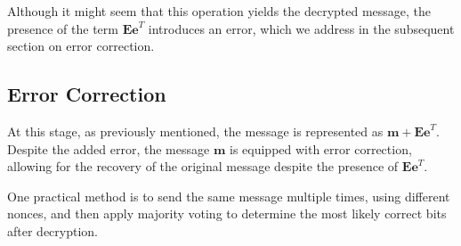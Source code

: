 Although it might seem that this operation yields the decrypted message, the presence of the term $\mathbf{Ee}^T$ introduces an error, which we address in the subsequent section on error correction.

\subsection{Error Correction}
At this stage, as previously mentioned, the message is represented as $\mathbf{m} + \mathbf{Ee}^T$. Despite the added error, the message $\mathbf{m}$ is equipped with error correction, allowing for the recovery of the original message despite the presence of $\mathbf{Ee}^T$.

One practical method is to send the same message multiple times, using different nonces, and then apply majority voting to determine the most likely correct bits after decryption.

